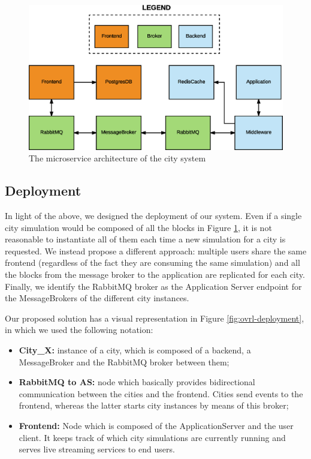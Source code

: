 \begin{figure}[H]
  \centering
  \includegraphics[scale=0.5,keepaspectratio]
    {images/solution/microservices.eps}
  \caption{The microservice architecture of the city system}
  \label{fig:sd-sys-arch-micro}
\end{figure}


\subsection{Deployment}
In light of the above, we designed the deployment of our system. Even
if a single city simulation would be composed of all the blocks in Figure
\ref{fig:sd-sys-arch-micro}, it is not reasonable to instantiate all of them
each time a new simulation for a city is requested.
We instead propose a different approach: multiple users share the same frontend
(regardless of the fact they are consuming the same simulation) and all the
blocks from the message broker to the application are replicated for each city.
Finally, we identify the RabbitMQ broker as the Application Server endpoint for
the MessageBrokers of the different city instances.

Our proposed solution has a visual representation in Figure
\ref{fig:ovrl-deployment}, in which we used the following notation:

\begin{itemize}
  \item \textbf{City\_X:} instance of a city, which is composed of a backend,
    a MessageBroker and the RabbitMQ broker between them;
  \item \textbf{RabbitMQ to AS:} node which basically provides bidirectional
    communication between the cities and the frontend. Cities send events to
    the frontend, whereas the latter starts city instances by means of this
    broker;
  \item \textbf{Frontend:} Node which is composed of the ApplicationServer and
    the user client. It keeps track of which city simulations are currently
    running and serves live streaming services to end users.
\end{itemize}

